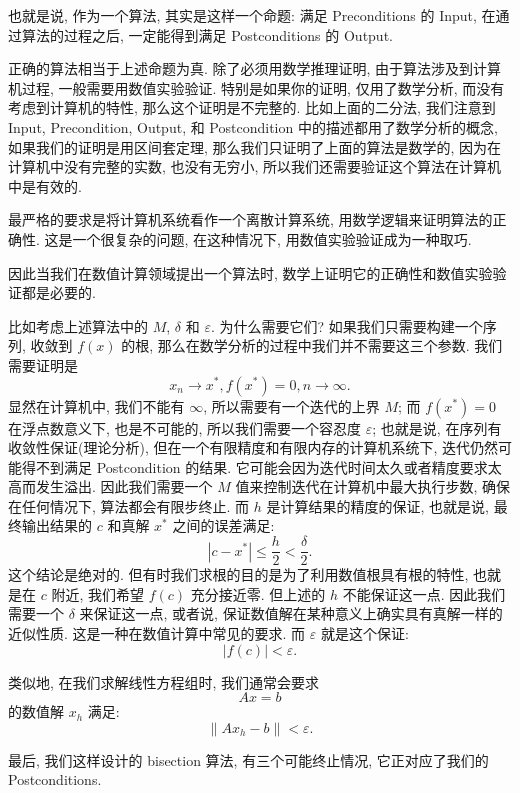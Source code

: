 \documentclass[a4paper]{ctexart}
\newcommand{\remark}[1]
{\noindent {\bf Remark {#1}}}
\begin{document}
也就是说, 作为一个算法, 其实是这样一个命题:
满足 Preconditions 的 Input, 在通过算法的过程之后, 一定能得到满足 Postconditions 的 Output. 

正确的算法相当于上述命题为真. 除了必须用数学推理证明, 由于算法涉及到计算机过程, 一般需要用数值实验验证. 
特别是如果你的证明, 仅用了数学分析, 而没有考虑到计算机的特性, 那么这个证明是不完整的. 比如上面的二分法,
我们注意到 Input, Precondition, Output, 和 Postcondition 中的描述都用了数学分析的概念, 如果我们的证明是用区间套定理,
那么我们只证明了上面的算法是数学的, 因为在计算机中没有完整的实数, 也没有无穷小, 所以我们还需要验证这个算法在计算机中是有效的.

最严格的要求是将计算机系统看作一个离散计算系统, 用数学逻辑来证明算法的正确性. 这是一个很复杂的问题, 在这种情况下, 
用数值实验验证成为一种取巧.

因此当我们在数值计算领域提出一个算法时, 数学上证明它的正确性和数值实验验证都是必要的.

\remark{1.2} 比如考虑上述算法中的 $M$, $\delta$ 和 $\varepsilon$. 
为什么需要它们? 如果我们只需要构建一个序列, 收敛到 $f(x)$ 的根, 
那么在数学分析的过程中我们并不需要这三个参数. 我们需要证明是
$$
x_n \rightarrow x^*, f(x^*) = 0, n \to \infty.
$$
显然在计算机中, 我们不能有 $\infty$, 所以需要有一个迭代的上界 $M$;
而 $f(x^*) = 0$ 在浮点数意义下, 也是不可能的, 所以我们需要一个容忍度 $\varepsilon$;
也就是说, 在序列有收敛性保证(理论分析), 但在一个有限精度和有限内存的计算机系统下, 迭代仍然可能得不到满足 Postcondition 的结果. 
它可能会因为迭代时间太久或者精度要求太高而发生溢出. 因此我们需要一个 $M$ 值来控制迭代在计算机中最大执行步数, 确保在任何情况下,
算法都会有限步终止. 而 $h$ 是计算结果的精度的保证, 也就是说, 最终输出结果的 $c$ 和真解 $x^*$ 之间的误差满足:
\[
|c - x^*| \leq \frac{h}{2} < \frac{\delta}{2}.
\]
这个结论是绝对的. 但有时我们求根的目的是为了利用数值根具有根的特性, 也就是在 $c$ 附近, 
我们希望 $f(c)$ 充分接近零. 但上述的 $h$ 不能保证这一点. 因此我们需要一个 $\delta$ 来保证这一点, 或者说, 
保证数值解在某种意义上确实具有真解一样的近似性质. 这是一种在数值计算中常见的要求. 
而 $\varepsilon$ 就是这个保证:
\[
|f(c)| < \varepsilon. 
\]

类似地, 在我们求解线性方程组时, 我们通常会要求 
\[
Ax = b
\]
的数值解 $x_h$ 满足:
\[
\|A x_h - b\| < \varepsilon.
\]

最后, 我们这样设计的 bisection 算法, 有三个可能终止情况, 它正对应了我们的 Postconditions. 

\end{document}
